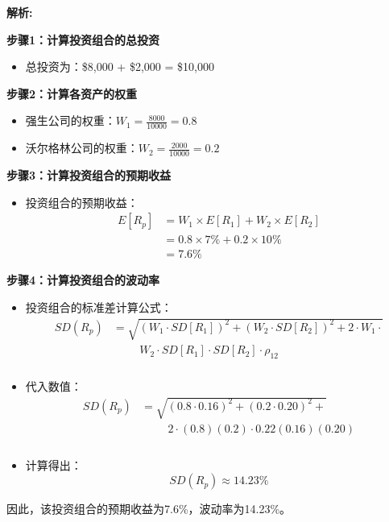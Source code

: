 \documentclass{article}
\newenvironment{explanation}
{\textbf{解析:}\par}
{\par}
\begin{document}
    \begin{explanation}
        \textbf{步骤1：计算投资组合的总投资}
        \begin{itemize}
            \item 总投资为：\$8,000 + \$2,000 = \$10,000
        \end{itemize}
    
        \textbf{步骤2：计算各资产的权重}
        \begin{itemize}
            \item 强生公司的权重：\(W_1 = \frac{8000}{10000} = 0.8\)
            \item 沃尔格林公司的权重：\(W_2 = \frac{2000}{10000} = 0.2\)
        \end{itemize}
    
        \textbf{步骤3：计算投资组合的预期收益}
        \begin{itemize}
            \item 投资组合的预期收益：
            \begin{align*}
            E[R_p] &= W_1 \times E[R_1] + W_2 \times E[R_2] \\
            &= 0.8 \times 7\% + 0.2 \times 10\% \\
            &= 7.6\%
            \end{align*}
        \end{itemize}
    
        \textbf{步骤4：计算投资组合的波动率}
        \begin{itemize}
            \item 投资组合的标准差计算公式：
            \begin{align*}
                SD(R_p) &= \sqrt{(W_1 \cdot SD[R_1])^2 + (W_2 \cdot SD[R_2])^2 + 2 \cdot W_1 \cdot{}} \\
                        &\phantom{= \sqrt{}} {W_2 \cdot SD[R_1] \cdot SD[R_2] \cdot \rho_{12}}
                \end{align*}
                \item 代入数值：
                \begin{align*}
                SD(R_p) &= \sqrt{(0.8 \cdot 0.16)^2 + (0.2 \cdot 0.20)^2 + {}} \\
                        &\phantom{= \sqrt{}} {2 \cdot (0.8)(0.2) \cdot 0.22(0.16)(0.20)}
            \end{align*}
            \item 计算得出：
            \[
            SD(R_p) \approx 14.23\%
            \]
        \end{itemize}
    
        因此，该投资组合的预期收益为7.6\%，波动率为14.23\%。
    \end{explanation}
\end{document}
